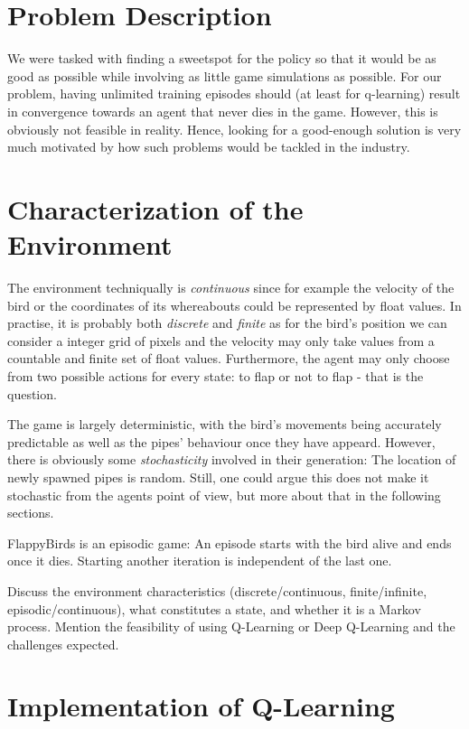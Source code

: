 \documentclass[a4paper,12pt]{article}
\begin{document}
\section{Problem Description}
We were tasked with finding a sweetspot for the policy so that it would be as good as possible while involving as 
little game simulations as
possible. For our problem, having unlimited training episodes should (at least for q-learning) result in convergence towards an agent 
that never dies in the game.
However, this is obviously not feasible in reality. Hence, looking for a good-enough solution is very much motivated by
how such problems would be tackled in the industry.

\section{Characterization of the Environment}
The environment techniqually is \textit{continuous} since for example the velocity of the bird or the coordinates of its whereabouts
could be represented by float values. In practise, it is probably both \textit{discrete} and \textit{finite} as for the bird's position we can consider a 
integer grid of pixels and the velocity may only take values from a countable and finite set of float values. Furthermore, the agent
may only choose from two possible actions for every state: to flap or not to flap - that is the question.

The game is largely deterministic, with the bird's movements being accurately predictable as well as the pipes' behaviour once they have
appeard.
However, there is obviously some \textit{stochasticity} involved in their generation: 
The location of newly spawned pipes is random. Still, one could argue
this does not make it stochastic from the agents point of view, but more about that in the following sections.

FlappyBirds is an episodic game: An episode starts with the bird alive and ends once it dies. Starting another iteration is independent
of the last one.



Discuss the environment characteristics (discrete/continuous, finite/infinite, episodic/continuous), 
what constitutes a state, and whether it is a Markov process. Mention the feasibility of using 
Q-Learning or Deep Q-Learning and the challenges expected.


\section{Implementation of Q-Learning}
\end{document}

